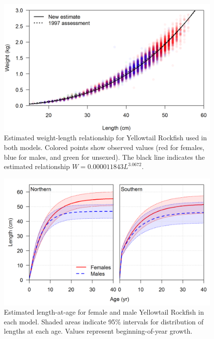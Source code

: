 \documentclass[12pt,]{article}
\begin{document}
\begin{figure}[htbp]
\centering
\includegraphics{Figures/weight-length_fit.png}
\caption{Estimated weight-length relationship for Yellowtail Rockfish
used in both models. Colored points show observed values (red for
females, blue for males, and green for unsexed). The black line
indicates the estimated relationship
\(W = 0.000011843L^{3.0672}\).\label{fig:weight-length}}
\end{figure}

\begin{figure}[htbp]
\centering
\includegraphics{r4ss/plots_compare/growth_comparison.png}
\caption{Estimated length-at-age for female and male Yellowtail Rockfish
in each model. Shaded areas indicate 95\% intervals for distribution of
lengths at each age. Values represent beginning-of-year growth.
\label{fig:growth}}
\end{figure}

\FloatBarrier 

\newpage
\end{document}
